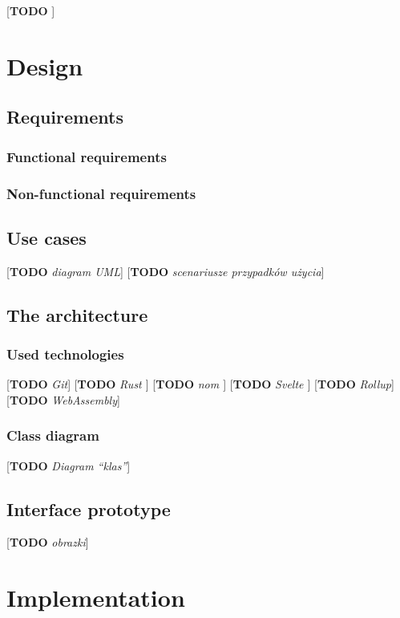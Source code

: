\documentclass[english,engineering]{wizthesis}
\newcommand{\todo}[1]{{\color{red}[\textbf{TODO} \textit{#1}]}}
\begin{document}
\todo{\cite{regex101}}

\chapter{Design}

\section{Requirements}

\subsection{Functional requirements}

\subsection{Non-functional requirements}

\section{Use cases}

\todo{diagram UML}
\todo{scenariusze przypadków użycia}

\section{The architecture}

\subsection{Used technologies}

\todo{Git}
\todo{Rust \cite{rust-book}}
\todo{nom \cite{couprie-2015}}
\todo{Svelte \cite{svelte-docs}}
\todo{Rollup}
\todo{WebAssembly}

\subsection{Class diagram}

\todo{Diagram ``klas''}

\section{Interface prototype}

\todo{obrazki}

\chapter{Implementation}
\end{document}
